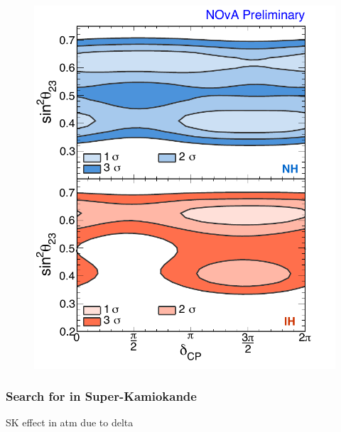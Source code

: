 \begin{figure} [h!]
\begin{center}
\includegraphics[width=14cm]{figures/nova_dcp.pdf}
\caption{\label{fig:novadcp}  }
\end{center}
\end{figure}



\subsubsection{ Search for \dcp in Super-Kamiokande}
SK effect in atm due to delta
